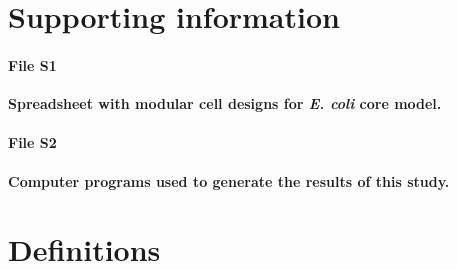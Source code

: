 \section*{Supporting information}

\paragraph{File S1}
\textbf{Spreadsheet with modular cell designs for \textit{E. coli} core model.}

\paragraph{File S2}
\textbf{Computer programs used to generate the results of this study.}






%


\section*{Definitions} \label{sec:definitions}
